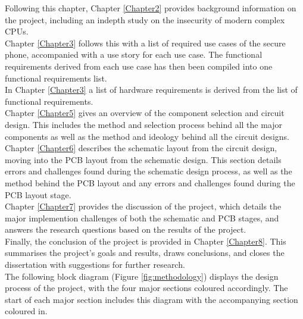 Following this chapter, Chapter \ref{Chapter2} provides background information on the project, including an indepth study on the insecurity of modern complex CPUs.\\ 
Chapter \ref{Chapter3} follows this with a list of required use cases of the secure phone, accompanied with a use story for each use case.
The functional requirements derived from each use case has then been compiled into one functional requirements list.\\ 
In Chapter \ref{Chapter3} a list of hardware requirements is derived from the list of functional requirements.\\
Chapter \ref{Chapter5} gives an overview of the component selection and circuit design. 
This includes the method and selection process behind all the major components as well as the method and ideology behind all the circuit designs.\\
Chapter \ref{Chapter6} describes the schematic layout from the circuit design, moving into the PCB layout from the schematic design.
This section details errors and challenges found during the schematic design process, as well as the method behind the PCB layout and any errors and challenges found during the PCB layout stage.\\
Chapter \ref{Chapter7} provides the discussion of the project, which details the major implemention challenges of both the schematic and PCB stages, and answers the research questions based on the results of the project.\\
Finally, the conclusion of the project is provided in Chapter \ref{Chapter8}.
This summarises the project's goals and results, draws conclusions, and closes the dissertation with suggestions for further research.\\
The following block diagram (Figure \ref{fig:methodology}) displays the design process of the project, with the four major sections coloured accordingly. The start of each major section includes this diagram with the accompanying section coloured in. 

